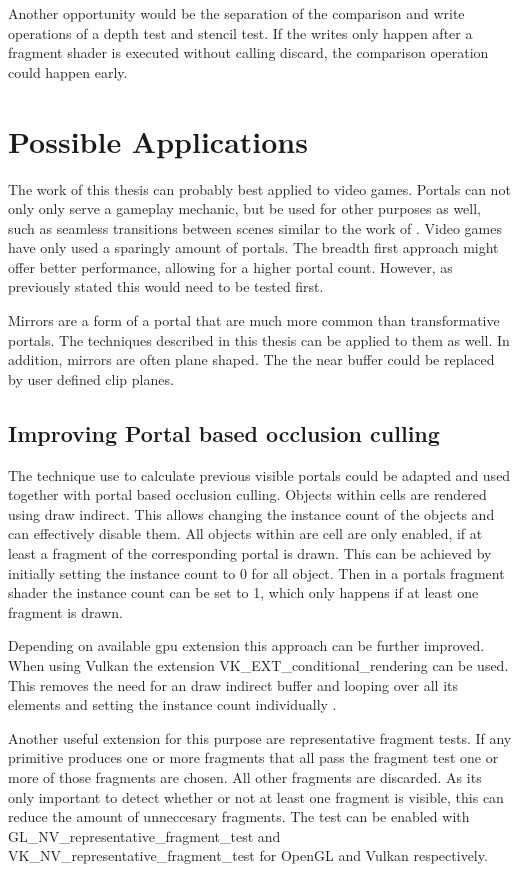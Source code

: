 Another opportunity would be the separation of the comparison and write operations of a depth test and stencil test. If the writes only happen after a fragment shader is executed without calling discard, the comparison operation could happen early.

\section{Possible Applications}
The work of this thesis can probably best applied to video games. Portals can not only only serve a gameplay mechanic, but be used for other purposes as well, such as seamless transitions between scenes similar to the work of \textcite{schmalstieg:1999:sewing}. Video games have only used a sparingly amount of portals. The breadth first approach might offer better performance, allowing for a higher portal count. However, as previously stated this would need to be tested first.

Mirrors are a form of a portal that are much more common than transformative portals. The techniques described in this thesis can be applied to them as well. In addition, mirrors are often plane shaped. The the near buffer could be replaced by user defined clip planes.


\subsection{Improving Portal based occlusion culling}
The technique use to calculate previous visible portals could be adapted and used together with portal based occlusion culling. Objects within cells are rendered using draw indirect. This allows changing the instance count of the objects and can effectively disable them. All objects within are cell are only enabled, if at least a fragment of the corresponding portal is drawn. This can be achieved by initially setting the instance count to 0 for all object. Then in a portals fragment shader the instance count can be set to 1, which only happens if at least one fragment is drawn.

Depending on  available \gls{gpu} extension this approach can be further improved. When using Vulkan the extension VK\_EXT\_conditional\_rendering can be used. This removes the need for an draw indirect buffer and looping over all its elements and setting the instance count individually \cite{khronos:vulkan:spec1.1}.

Another useful extension for this purpose are representative fragment tests. If any primitive produces one or more fragments that all pass the fragment test one or more of those fragments are chosen. All other fragments are discarded. As its only important to detect whether or not at least one fragment is visible, this can reduce the amount of unneccesary fragments. The test can be enabled with GL\_NV\_representative\_fragment\_test and VK\_NV\_representative\_fragment\_test for OpenGL \cite{khronos:openGL:representative} and Vulkan\cite{khronos:vulkan:spec1.1} respectively.


